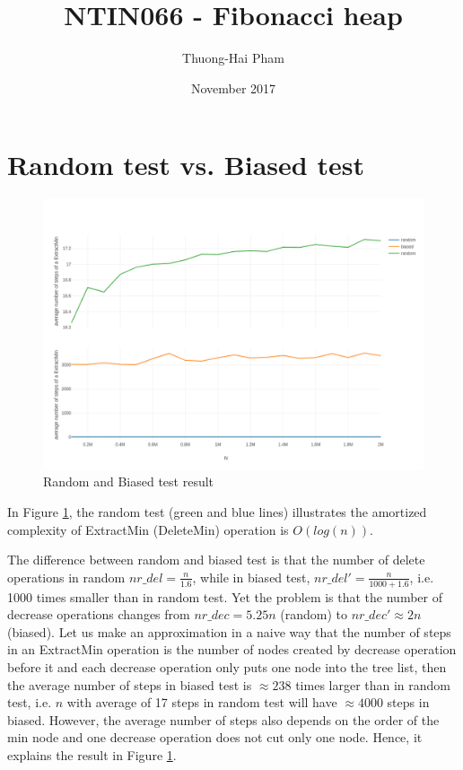 \documentclass{article}
\title{NTIN066 - Fibonacci heap}
\author{Thuong-Hai Pham}
\date{November 2017}
\begin{document}
\maketitle

\section{Random test vs. Biased test}

\begin{figure}[h!]
\centering
\includegraphics[width=\textwidth]{NTIN066-fibheap-plot3}
\caption{Random and Biased test result}
\label{fig:plot3}
\end{figure}

In Figure \ref{fig:plot3}, the random test (green and blue lines) illustrates the amortized complexity of ExtractMin (DeleteMin) operation is $O(log(n))$.

The difference between random and biased test is that the number of delete operations in random $nr\_del=\frac{n}{1.6}$, while in biased test, $nr\_del'=\frac{n}{1000+1.6}$, i.e. 1000 times smaller than in random test. Yet the problem is that the number of decrease operations changes from $nr\_dec=5.25n$ (random) to $nr\_dec'\approx 2n$ (biased). Let us make an approximation in a naive way that the number of steps in an ExtractMin operation is the number of nodes created by decrease operation before it and each decrease operation only puts one node into the tree list, then the average number of steps in biased test is $\approx 238$ times larger than in random test, i.e. $n$ with average of 17 steps in random test will have $\approx 4000$ steps in biased. However, the average number of steps also depends on the order of the min node and one decrease operation does not cut only one node. Hence, it explains the result in Figure \ref{fig:plot3}.
\end{document}
